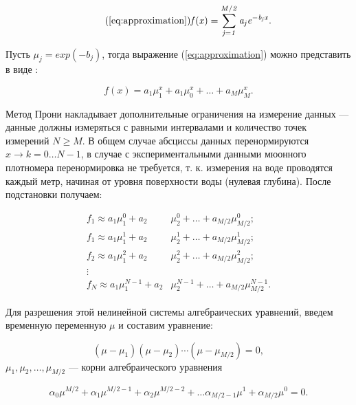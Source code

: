 \begin{equation}
  \tag{\ref{eq:approximation}}
  \mathit{ f(x)  = \displaystyle\sum_{j=1}^{M/2} a_j e^{-b_j x} }.  
\end{equation}

Пусть $\mu_j = exp(-b_j)$, тогда выражение (\ref{eq:approximation}) можно представить в виде :

\begin{equation}
  \label{eq:prony_nonlinear}
  \mathit{ f(x)  = a_1 \mu_1^x + a_1 \mu_0^x + \ldots + a_M \mu_M^x }.
\end{equation}


Метод Прони накладывает дополнительные ограничения на измерение данных --- данные должны измеряться с равными 
интервалами и количество точек измерений $N \geq M$. В общем случае абсциссы данных перенормируются $x \to k = 0 \ldots N-1$, 
в случае с экспериментальными данными мюонного плотномера перенормировка не требуется, т. к. измерения на воде
проводятся каждый метр, начиная от уровня поверхности воды (нулевая глубина). После подстановки получаем:

\begin{equation}
  \begin{split}
  f_1  \approx a_1 \mu_1^0 + a_2 & \mu_2^0 + \ldots + a_{M/2} \mu_{M/2}^0; \\
  f_1  \approx a_1 \mu_1^1 + a_2 & \mu_2^1 + \ldots + a_{M/2} \mu_{M/2}^1;  \\
  f_2  \approx a_1 \mu_1^2 + a_2 & \mu_2^2 + \ldots + a_{M/2} \mu_{M/2}^2;  \\
  \vdots & \\
  f_N \approx a_1 \mu_{1}^{N-1} + a_2 & \mu_{2}^{N-1} + \ldots + a_{M/2} \mu_{M/2}^{N-1}.
  \end{split}
  \label{eq:prony_system}
\end{equation}

Для разрешения этой нелинейной системы алгебраических уравнений, введем временную переменную $\mu$ и составим уравнение: 

\begin{equation}
\label{eq:prony_algebra}
	\left( \mu - \mu_1 \right) 
	\left( \mu - \mu_2 \right) \cdots 
	\left( \mu - \mu_{M/2} \right) = 0, 
\end{equation}
$\mu_1,\mu_2, \ldots , \mu_{M/2}$ --- корни алгебраического
уравнения 

\begin{equation}
	\label{eq:prony_alpha}
	\alpha_0 \mu ^ {M/2} + 
	\alpha_1 \mu ^ {M/2-1} + 
	\alpha_2 \mu ^ {M/2-2} + \ldots
	\alpha_{M/2-1} \mu ^ 1 + 
	\alpha_{M/2} \mu ^ 0 = 0.
\end{equation}

